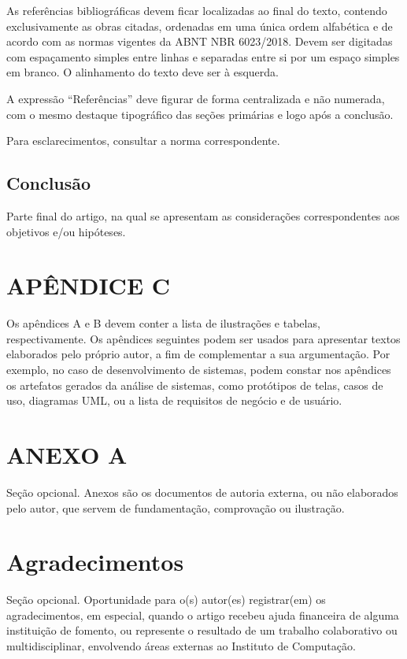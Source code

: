 \documentclass[article,a4paper,12pt,brazil,sumario=tradicional]{abntex2}
\begin{document}
As referências bibliográficas devem ficar localizadas ao final do texto, contendo exclusivamente as obras citadas, ordenadas em uma única ordem alfabética e de acordo com as normas vigentes da ABNT NBR 6023/2018. Devem ser digitadas com espaçamento simples entre linhas e separadas entre si por um espaço simples em branco. O alinhamento do texto deve ser à esquerda.

A expressão ``Referências'' deve figurar de forma centralizada e não numerada, com o mesmo destaque tipográfico das seções primárias e logo após a conclusão.

Para esclarecimentos, consultar a norma correspondente.

\section{Conclusão}

Parte final do artigo, na qual se apresentam as considerações correspondentes aos objetivos e/ou hipóteses.

\newpage


\newpage
\renewcommand{\listfigurename}{APÊNDICE A - Lista de ilustrações}
\listoffigures

\newpage
\renewcommand{\listtablename}{APÊNDICE B - Lista de tabelas}
\listoftables

\begin{appendices}
\newpage
\chapter* {APÊNDICE C}
\noindent
Os apêndices A e B devem conter a lista de ilustrações e tabelas, respectivamente. Os apêndices seguintes podem ser usados para apresentar textos elaborados pelo próprio autor, a fim de complementar a sua argumentação. Por exemplo, no caso de desenvolvimento de sistemas, podem constar nos apêndices os artefatos gerados da análise de sistemas, como protótipos de telas, casos de uso, diagramas UML, ou a lista de requisitos de negócio e de usuário.

\newpage
\chapter*{ANEXO A}
\noindent
Seção opcional. Anexos são os documentos de autoria externa, ou não elaborados pelo autor, que servem de fundamentação, comprovação ou ilustração.
\end{appendices}

\newpage
\chapter*{Agradecimentos}
\noindent
Seção opcional. Oportunidade para o(s) autor(es) registrar(em) os agradecimentos, em especial, quando o artigo recebeu ajuda financeira de alguma instituição de fomento, ou represente o resultado de um trabalho colaborativo ou multidisciplinar, envolvendo áreas externas ao Instituto de Computação.
\end{document}
